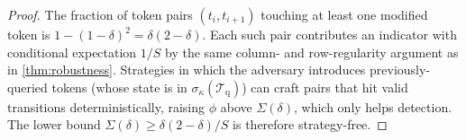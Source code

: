 \begin{proof}
  The fraction of token pairs $(t_i, t_{i+1})$ touching at least one
  modified token is $1 - (1-\delta)^2 = \delta(2 - \delta)$.  Each
  such pair contributes an indicator with conditional expectation
  $1/S$ by the same column- and row-regularity argument as in
  \autoref{thm:robustness}.  Strategies in which the adversary
  introduces previously-queried tokens (whose state is in
  $\sigma_\kappa(\mathcal{T}_{\mathrm{q}})$) can craft pairs that hit valid
  transitions deterministically, raising $\phi$ above
  $\Sigma(\delta)$, which only helps detection.  The lower bound
  $\Sigma(\delta) \geq \delta(2-\delta)/S$ is therefore strategy-free.
\end{proof}

